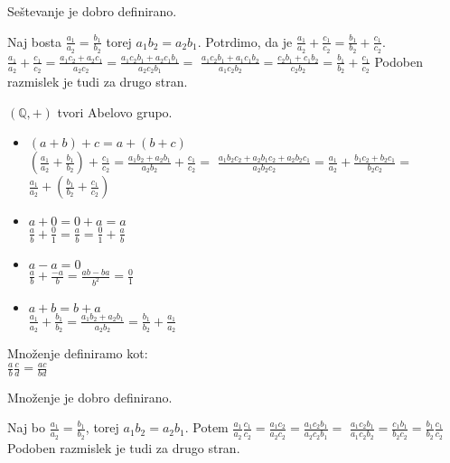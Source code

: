 \begin{trditev}
    Seštevanje je dobro definirano.
\end{trditev}
\begin{dokaz}
    Naj bosta $\frac{a_1}{a_2} = \frac{b_1}{b_2}$ torej $a_1 b_2 = a_2 b_1$.
    Potrdimo, da je $\frac{a_1}{a_2} + \frac{c_1}{c_2} = \frac{b_1}{b_2} + \frac{c_1}{c_2}$.
    $\frac{a_1}{a_2} + \frac{c_1}{c_2} = \frac{a_1 c_2 + a_2 c_1}{a_2 c_2} = \frac{a_1 c_2 b_1 + a_2 c_1 b_1}{a_2 c_2 b_1} =$
    $\frac{a_1 c_2 b_1 + a_1 c_1 b_2}{a_1 c_2 b_2} = \frac{c_2 b_1 + c_1 b_2}{c_2 b_2} = \frac{b_1}{b_2} + \frac{c_1}{c_2}$
    Podoben razmislek je tudi za drugo stran.
\end{dokaz}

\begin{trditev}
    $(\mathbb{Q}, +)$ tvori Abelovo grupo.
\end{trditev}
\begin{dokaz}
    \begin{itemize}
        \item $(a + b) + c = a + (b + c)$ \\
        $\left(\frac{a_1}{a_2} + \frac{b_1}{b_2}\right) + \frac{c_1}{c_2} = \frac{a_1 b_2 + a_2 b_1}{a_2 b_2} + \frac{c_1}{c_2} = $
        $\frac{a_1 b_2 c_2 + a_2 b_1 c_2 + a_2 b_2 c_1}{a_2 b_2 c_2} = \frac{a_1}{a_2} + \frac{b_1 c_2 + b_2 c_1}{b_2 c_2} =$
        $\frac{a_1}{a_2} + \left(\frac{b_1}{b_2} + \frac{c_1}{c_2}\right)$
        \item $a + 0 = 0 + a = a$ \\
        $\frac{a}{b} + \frac{0}{1} = \frac{a}{b} = \frac{0}{1} + \frac{a}{b}$
        \item $a - a = 0$ \\
        $\frac{a}{b} + \frac{-a}{b} = \frac{ab - ba}{b^2} = \frac{0}{1}$
        \item $a + b = b + a$ \\
        $\frac{a_1}{a_2} + \frac{b_1}{b_2} = \frac{a_1 b_2 + a_2 b_1}{a_2 b_2} = \frac{b_1}{b_2} + \frac{a_1}{a_2}$
    \end{itemize}
\end{dokaz}

\begin{definicija}
    Množenje definiramo kot: \\
    $\frac{a}{b}\frac{c}{d} = \frac{ac}{bd}$
\end{definicija}

\begin{trditev}
    Množenje je dobro definirano.
\end{trditev}
\begin{dokaz}
    Naj bo $\frac{a_1}{a_2} = \frac{b_1}{b_2}$, torej $a_1 b_2 = a_2 b_1$.
    Potem $\frac{a_1}{a_2} \frac{c_1}{c_2} = \frac{a_1 c_2}{a_2 c_2} = \frac{a_1 c_2 b_1}{a_2 c_2 b_1} = $
    $\frac{a_1 c_2 b_1}{a_1 c_2 b_2} = \frac{c_1 b_1}{b_2 c_2} = \frac{b_1}{b_2} \frac{c_1}{c_2}$
    Podoben razmislek je tudi za drugo stran.
\end{dokaz}

